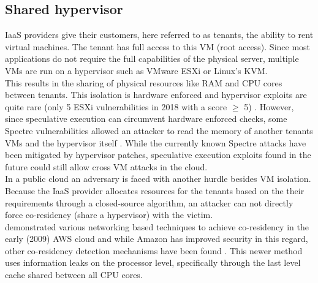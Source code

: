 \documentclass[conference,compsoc,final,a4paper]{IEEEtran}
\begin{document}
\subsection{Shared hypervisor}
\ac{IaaS} providers give their customers, here referred to as tenants, the ability to rent virtual machines. The tenant has full access
to this VM (root access). Since most applications do not require the full capabilities of the physical server, multiple VMs are run on a hypervisor such as VMware
ESXi or Linux's KVM. \\
This results in the sharing of physical resources like RAM and CPU cores between tenants. This isolation is hardware enforced
and hypervisor exploits are quite rare (only 5 ESXi vulnerabilities in 2018 with a score $\ge$ 5) \cite{esxiVulnerabilities}. However, since speculative execution can
circumvent hardware enforced checks, some Spectre vulnerabilities allowed an attacker to read the memory of another tenants VMs and the hypervisor
itself \cite{vmwareSpectre, vmwareSpectreNG}. While the currently known Spectre attacks have been mitigated by hypervisor patches, speculative execution exploits
found in the future could still allow cross VM attacks in the cloud. \\
In a public cloud an adversary is faced with another hurdle besides VM isolation. Because the \ac{IaaS} provider allocates resources for the tenants based on the their
requirements through a closed-source algorithm, an attacker can not directly force co-residency (share a hypervisor) with the victim. \\
\textcite{Ristenpart:2009:HYG:1653662.1653687} demonstrated various networking based techniques to achieve co-residency in the early (2009) \ac{AWS} cloud and while Amazon
has improved security in this regard, other co-residency detection mechanisms have been found \cite{inci2015seriously}. This newer method uses information leaks
on the processor level, specifically through the last level cache shared between all CPU cores.
\end{document}
